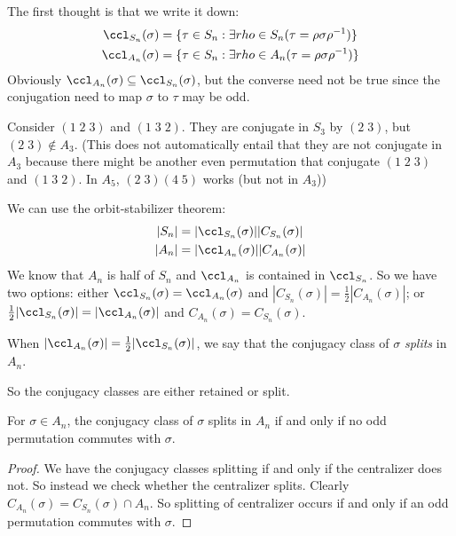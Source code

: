 \documentclass[a4pape]{article}
\begin{document}
The first thought is that we write it down:
\begin{align*}
  \ccl_{S_n}(\sigma) &= \{\tau\in S_n: \exists rho \in S_n(\tau = \rho\sigma\rho^{-1})\}\\
  \ccl_{A_n}(\sigma) &= \{\tau\in S_n: \exists rho \in A_n(\tau = \rho\sigma\rho^{-1})\}
\end{align*}
Obviously $\ccl_{A_n}(\sigma)\subseteq \ccl_{S_n}(\sigma)$, but the converse need not be true since the conjugation need to map $\sigma$ to $\tau$ may be odd. 

\begin{eg}
  Consider $(1\; 2\; 3)$ and $(1\; 3\; 2)$. They are conjugate in $S_3$ by $(2\; 3)$, but $(2\; 3)\not\in A_3$. (This does not automatically entail that they are not conjugate in $A_3$ because there might be another even permutation that conjugate $(1\; 2\; 3)$ and $(1\; 3\; 2)$. In $A_5$, $(2\; 3)(4\; 5)$ works (but not in $A_3$))
\end{eg}

We can use the orbit-stabilizer theorem:
\begin{align*}
  |S_n| &= |\ccl_{S_n}(\sigma)||C_{S_n}(\sigma)|\\
  |A_n| &= |\ccl_{A_n}(\sigma)||C_{A_n}(\sigma)|
\end{align*}
We know that $A_n$ is half of $S_n$ and $\ccl_{A_n}$ is contained in $\ccl_{S_n}$. So we have two options: either $\ccl_{S_n}(\sigma) = \ccl_{A_n}(\sigma)$ and $|C_{S_n}(\sigma)| = \frac{1}{2}|C_{A_n}(\sigma)|$; or $\frac{1}{2}|\ccl_{S_n}(\sigma)| = |\ccl_{A_n}(\sigma)|$ and $C_{A_n}(\sigma) = C_{S_n}(\sigma)$.

\begin{defi}
  When $|\ccl_{A_n}(\sigma)| = \frac{1}{2}|\ccl_{S_n}(\sigma)|$, we say that the conjugacy class of $\sigma$ \emph{splits} in $A_n$. 
\end{defi}

So the conjugacy classes are either retained or split.

\begin{prop}
  For $\sigma\in A_n$, the conjugacy class of $\sigma$ splits in $A_n$ if and only if no odd permutation commutes with $\sigma$. 
\end{prop}

\begin{proof}
  We have the conjugacy classes splitting if and only if the centralizer does not. So instead we check whether the centralizer splits. Clearly $C_{A_n}(\sigma) = C_{S_n}(\sigma)\cap A_n$. So splitting of centralizer occurs if and only if an odd permutation commutes with $\sigma$.
\end{proof}
\end{document}

